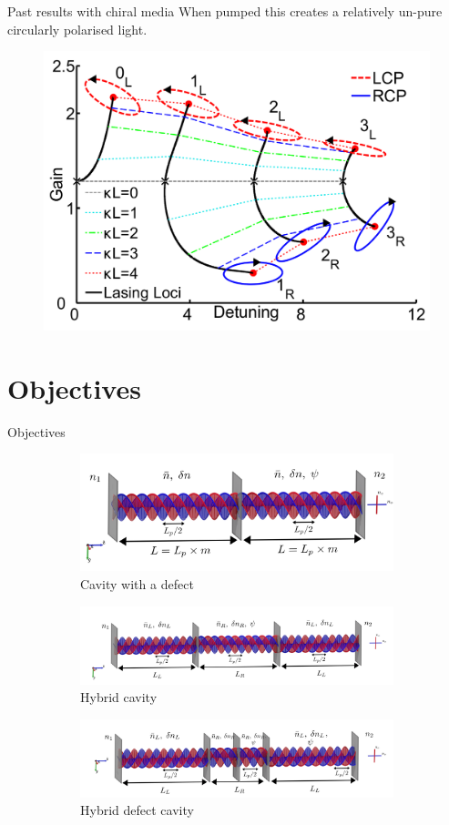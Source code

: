 \documentclass[aspectratio=169]{beamer}
\begin{document}
\begin{frame}{Past results with chiral media}
	When pumped this creates a relatively un-pure circularly polarised light.
	\begin{figure}
		\centering
		\includegraphics[width=0.4\linewidth]{images/martin_output_mode}
		\caption{}
	\end{figure}
\end{frame}

\section{Objectives}

\begin{frame}{Objectives}
	\begin{figure}
		\centering
		\begin{subfigure}{0.39\linewidth}
			\includegraphics[width=\linewidth]{images/defect.png}
			\caption{Cavity with a defect}
		\end{subfigure}
		\begin{subfigure}{0.60\linewidth}
			\includegraphics[width=\linewidth]{images/hybrid.png}
			\caption{Hybrid cavity}
		\end{subfigure}
		\begin{subfigure}{\linewidth}
			\includegraphics[width=\linewidth]{images/hybrid_defect.png}
			\caption{Hybrid defect cavity}
		\end{subfigure}
		\caption{}
	\end{figure}
\end{frame}
\end{document}
